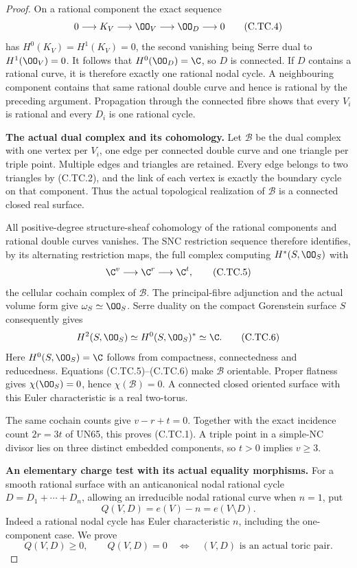 \begin{proof}
On a rational component the exact sequence
\[
 0\longrightarrow K_V\longrightarrow\OO_V
                 \longrightarrow\OO_D\longrightarrow0
\tag{C.TC.4}
\]
has $H^0(K_V)=H^1(K_V)=0$, the second vanishing
being Serre dual to $H^1(\OO_V)=0$.
It follows that $H^0(\OO_D)=\C$, so $D$ is
connected. If $D$ contains a rational curve,
it is therefore exactly one rational nodal
cycle. A neighbouring component contains
that same rational double curve and hence
is rational by the preceding argument.
Propagation through the connected fibre
shows that every $V_i$ is rational and
every $D_i$ is one rational cycle.

\par\medskip\noindent\textbf{The actual dual complex and its cohomology.}
Let $\mathcal B$ be the dual complex with
one vertex per $V_i$, one edge per connected
double curve and one triangle per triple
point. Multiple edges and triangles are
retained. Every edge belongs to two
triangles by (C.TC.2), and the link of
each vertex is exactly the boundary cycle
on that component. Thus the actual
topological realization of $\mathcal B$
is a connected closed real surface.

All positive-degree structure-sheaf
cohomology of the rational components
and rational double curves vanishes.
The SNC restriction sequence therefore
identifies, by its alternating restriction
maps, the full complex computing
$H^*(S,\OO_S)$ with
\[
           \C^{v}\longrightarrow\C^{r}
                                  \longrightarrow\C^{t},
\tag{C.TC.5}
\]
the cellular cochain complex of
$\mathcal B$. The principal-fibre
adjunction and the actual volume form
give $\omega_S\simeq\OO_S$.
Serre duality on the compact Gorenstein
surface $S$ consequently gives
\[
             H^2(S,\OO_S)\simeq
                         H^0(S,\OO_S)^*\simeq\C.
\tag{C.TC.6}
\]
Here $H^0(S,\OO_S)=\C$ follows from
compactness, connectedness and reducedness.
Equations (C.TC.5)--(C.TC.6) make
$\mathcal B$ orientable. Proper flatness
gives $\chi(\OO_S)=0$, hence
$\chi(\mathcal B)=0$. A connected closed
oriented surface with this Euler
characteristic is a real two-torus.

The same cochain counts give
$v-r+t=0$. Together with the exact
incidence count $2r=3t$ of UN65,
this proves (C.TC.1). A triple point
in a simple-NC divisor lies on three
distinct embedded components, so
$t>0$ implies $v\ge3$.

\par\medskip\noindent\textbf{An elementary charge test with its actual equality morphisms.}
For a smooth rational surface with an
anticanonical nodal rational cycle
$D=D_1+\cdots+D_n$, allowing an
irreducible nodal rational curve when
$n=1$, put
\[
                        Q(V,D)=e(V)-n=e(V\setminus D).
\tag{C.TC.7}
\]
Indeed a rational nodal cycle has
Euler characteristic $n$, including
the one-component case. We prove
\[
 Q(V,D)\ge0,\qquad Q(V,D)=0
       \quad\Longleftrightarrow\quad
       (V,D)\text{ is an actual toric pair}.
\tag{C.TC.8}
\]


\end{proof}
